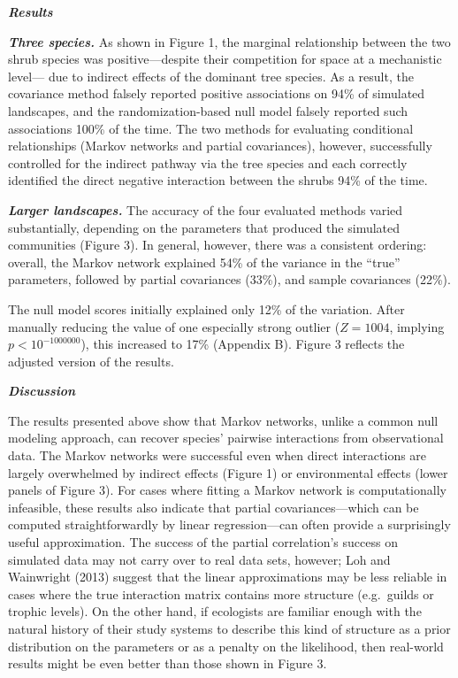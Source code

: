 \documentclass[12pt,]{article}
\begin{document}
\begin{spacing}{1.9}
\begin{flushleft}
\textbf{\emph{Results}}

\textbf{\emph{Three species.}} As shown in Figure 1, the marginal
relationship between the two shrub species was positive---despite their
competition for space at a mechanistic level--- due to indirect effects
of the dominant tree species. As a result, the covariance method falsely
reported positive associations on 94\% of simulated landscapes, and the
randomization-based null model falsely reported such associations 100\%
of the time. The two methods for evaluating conditional relationships
(Markov networks and partial covariances), however, successfully
controlled for the indirect pathway via the tree species and each
correctly identified the direct negative interaction between the shrubs
94\% of the time.

\textbf{\emph{Larger landscapes.}} The accuracy of the four evaluated
methods varied substantially, depending on the parameters that produced
the simulated communities (Figure 3). In general, however, there was a
consistent ordering: overall, the Markov network explained 54\% of the
variance in the ``true'' parameters, followed by partial covariances
(33\%), and sample covariances (22\%).

The null model scores initially explained only 12\% of the variation.
After manually reducing the value of one especially strong outlier
(\(Z=1004\), implying \(p<10^{-1000000}\)), this increased to 17\%
(Appendix B). Figure 3 reflects the adjusted version of the results.

\textbf{\emph{Discussion}}

The results presented above show that Markov networks, unlike a common
null modeling approach, can recover species' pairwise interactions from
observational data. The Markov networks were successful even when direct
interactions are largely overwhelmed by indirect effects (Figure 1) or
environmental effects (lower panels of Figure 3). For cases where
fitting a Markov network is computationally infeasible, these results
also indicate that partial covariances---which can be computed
straightforwardly by linear regression---can often provide a
surprisingly useful approximation. The success of the partial
correlation's success on simulated data may not carry over to real data
sets, however; Loh and Wainwright (2013) suggest that the linear
approximations may be less reliable in cases where the true interaction
matrix contains more structure (e.g.~guilds or trophic levels). On the
other hand, if ecologists are familiar enough with the natural history
of their study systems to describe this kind of structure as a prior
distribution on the parameters or as a penalty on the likelihood, then
real-world results might be even better than those shown in Figure 3.


\end{flushleft}
\end{spacing}
\end{document}
